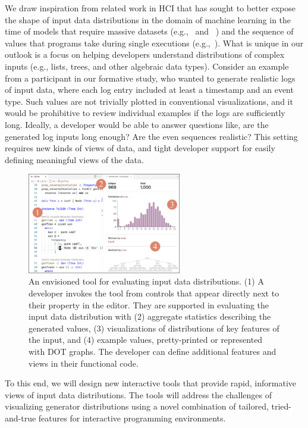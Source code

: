 We draw inspiration from related work in HCI that has sought to better expose
the shape of input data distributions in the domain of machine learning in the time of models
that require massive datasets (e.g.,~\cite{ref:hohman2019gamut} and
~\cite{ref:hohman2020understanding}) and the sequence of values that programs
take during single executions (e.g.,~\cite{ref:kang2017omnicode}). What is unique
in our outlook is a focus on helping developers understand distributions of
complex inputs (e.g., lists, trees, and other algebraic data types). Consider an
example from a participant in our formative study, who wanted to generate
realistic logs of input data, where each log entry included at least a timestamp
and an event type. Such values are not trivially plotted in conventional
visualizations, and it would be prohibitive to review individual examples if the
logs are sufficiently long. Ideally, a developer would be able to answer
questions like, are the generated log inputs long enough? Are the even sequences
realistic?  This setting requires new kinds of views of data, and tight
developer support for easily defining meaningful views of the data.

\begin{figure}
  \centering
  \includegraphics[width=0.6\textwidth]{assets/gen-vis.pdf}
  \caption{An envisioned tool for evaluating input data distributions.
  (1) A developer invokes the tool from controls that appear directly
  next to their property in the editor. They are supported in evaluating the
  input data distribution with (2) aggregate statistics describing the generated
  values, (3) visualizations of distributions of key features of the input, and (4)
  example values, pretty-printed or represented with DOT graphs. The developer can define additional
  features and views in their functional code.}\label{fig:gen-vis}
\end{figure}

To this end, we will design new interactive tools that provide rapid,
informative views of input data distributions. The tools will address the
challenges of visualizing generator distributions using a novel combination of
tailored, tried-and-true features for interactive programming environments.

